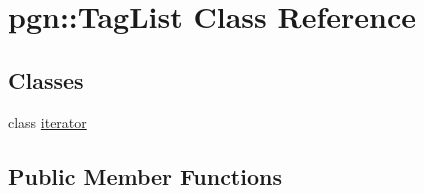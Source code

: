 \hypertarget{classpgn_1_1TagList}{
\section{pgn::TagList Class Reference}
\label{classpgn_1_1TagList}
}
\subsection*{Classes}
\begin{DoxyCompactItemize}
\item 
class \hyperlink{classpgn_1_1TagList_1_1iterator}{iterator}
\end{DoxyCompactItemize}
\subsection*{Public Member Functions}
